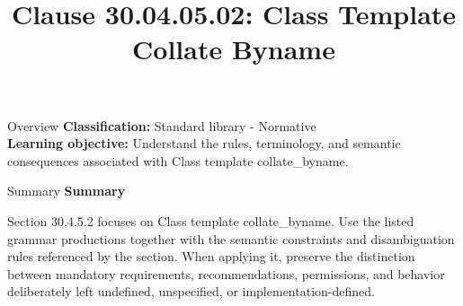 \documentclass[10pt,letterpaper]{article}
\title{Clause 30.04.05.02: Class Template Collate Byname}
\author{}
\date{}
\begin{document}
\maketitle
\begin{CornellOverviewBox}{Overview}
\textbf{Classification:} Standard library - Normative\\[2pt]
\textbf{Learning objective:} Understand the rules, terminology, and semantic consequences associated with Class template collate\_byname.
\end{CornellOverviewBox}\begin{CornellSummaryBox}{Summary}
{\sffamily\bfseries\color{Accent} Summary}\par\vspace{3pt}Section 30.4.5.2 focuses on Class template collate\_byname. Use the listed grammar productions together with the semantic constraints and disambiguation rules referenced by the section. When applying it, preserve the distinction between mandatory requirements, recommendations, permissions, and behavior deliberately left undefined, unspecified, or implementation-defined.
\end{CornellSummaryBox}
\end{document}

